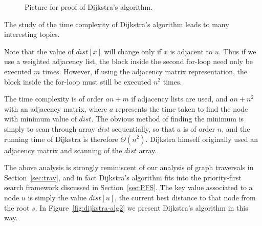 \begin{figure}
\centerline{}
\caption{Picture for proof of Dijkstra's algorithm.}
\label{fig:dijk-proof2}
\end{figure}

The study of the time complexity of Dijkstra's algorithm leads to many
interesting topics.

Note that the value of $dist[x]$ will change only if $x$ is adjacent to
$u$. Thus if we use a weighted adjacency list, the block inside the
second for-loop need only be executed $m$ times. However, if
using the adjacency matrix representation, the block inside the for-loop
must still be executed $n^2$ times.

The time complexity is of order $a n + m$ if adjacency lists are used,
and $a n + n^2$ with an adjacency matrix, where $a$ represents the time
taken to find the node with minimum value of $dist$. The obvious method
of finding the minimum is simply to scan through array $dist$
sequentially, so that $a$ is of order $n$, and the running time of
Dijkstra is therefore $\Theta(n^2)$. Dijkstra himself originally used
an adjacency matrix and scanning of the $dist$ array. 

The above analysis is strongly reminiscent of our analysis of graph
traversals in Section~\ref{sec:trav}, and in fact Dijkstra's algorithm fits
into the priority-first search framework discussed in
Section~\ref{sec:PFS}. The key value associated to a node $u$ is simply the
value $dist[u]$, the current best distance to that node from the root $s$.
In Figure~\ref{fig:dijkstra-alg2} we present Dijkstra's algorithm in this
way.

